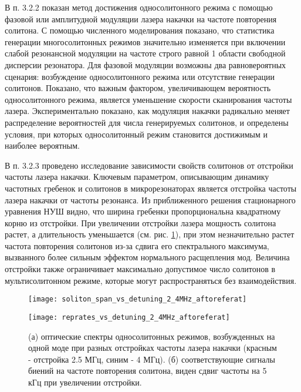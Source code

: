 В п. 3.2.2 показан метод достижения односолитонного режима с помощью фазовой или амплитудной модуляции лазера накачки на частоте повторения солитона. С помощью численного моделирования показано, что статистика генерации многосолитонных режимов значительно изменяется при включении слабой резонансной модуляции на частоте строго равной 1 области свободной дисперсии резонатора. Для фазовой модуляции возможны два равновероятных сценария: возбуждение односолитонного режима или отсутствие генерации солитонов. Показано, что важным фактором, увеличивающем вероятность односолитонного режима, является уменьшение скорости сканирования частоты лазера. Экспериментально показано, как модуляция накачки радикально меняет распределение вероятностей для числа генерируемых солитонов, и определены условия, при которых односолитонный режим становится достижимым и наиболее вероятным.

В п. 3.2.3 проведено исследование зависимости свойств солитонов от отстройки частоты лазера накачки. Ключевым параметром, описывающим динамику частотных гребенок и солитонов в микрорезонаторах является отстройка частоты лазера накачки от частоты резонанса. Из приближенного решения стационарного уравнения НУШ видно, что ширина гребенки пропорциональна квадратному корню из отстройки. При увеличении отстройки лазера мощность солитона растет, а длительность уменьшается (см. рис. \ref{detuning_dependant}), при этом незначительно растет частота повторения солитонов из-за сдвига его спектрального максимума, вызванного более сильным эффектом нормального расщепления мод. Величина отстройки также ограничивает максимально допустимое число солитонов в мультисолитонном режиме, которые могут распространяться без взаимодействия.

\begin{figure}[!htb]
  \begin{minipage}{0.49\linewidth}\centering
    \texttt{[image: soliton\_span\_vs\_detuning\_2\_4MHz\_aftoreferat]}
  \end{minipage}
  \hfill
  \begin{minipage}{0.49\linewidth}\centering
    \texttt{[image: reprates\_vs\_detuning\_2\_4MHz\_aftoreferat]}
  \end{minipage}
  \caption{(а) оптические спектры односолитонных режимов, возбужденных на одной моде при разных отстройках частоты лазера накачки (красным - отстройка 2.5 МГц, синим - 4 МГц). (б) соответствующие сигналы биений на частоте повторения солитона, виден сдвиг частоты на 5 кГц при увеличении отстройки.}
  \label{detuning_dependant}
\end{figure}

